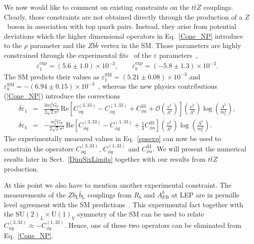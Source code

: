 \documentclass[preprint]{JHEP3}
\def\ttbZ{t\bar{t}Z}
\newcommand{\be}{\begin{eqnarray}}
\newcommand{\ee}{\end{eqnarray}}
\begin{document}
We now would like to comment on existing constraints on the $\ttbZ$ couplings.
Clearly, those constraints are not obtained directly through the production of a $Z$~boson in association with top quark pairs.
Instead, they arise from potential deviations which the higher dimensional operators in Eq.~\ref{Cone_NP} introduce to the $\rho$ parameter and the $Z b \bar{b}$ vertex in the SM.
Those parameters are highly constrained through the experimental fits~\cite{Ciuchini:2013pca} of the $\varepsilon$ parameters~\cite{Altarelli:1993sz},
\be
   \label{epsexp}
   \varepsilon_1^\mathrm{exp} = (5.6 \pm 1.0) \times 10^{-3}, \quad \quad \varepsilon_b^\mathrm{exp} = (-5.8 \pm 1.3) \times 10^{-3}.
\ee
The SM predicts their values as $\varepsilon_1^\mathrm{SM} = (5.21 \pm 0.08) \times 10^{-3} $ and $\varepsilon_b^\mathrm{SM} = -(6.94 \pm 0.15) \times 10^{-3}$~\cite{Ciuchini:2013pca},
whereas the new physics contributions (\ref{Cone_NP}) introduce the corrections~\cite{Larios:1999au}
\be
   \delta \varepsilon_1 &=& \frac{3 m_t^2 G_\mathrm{F}}{2\sqrt{2}\pi^2}  
   \, \mathrm{Re}\left[  C^{(3,33)}_{\phi q}-C^{(1,33)}_{\phi q} + C^{33}_{\phi u} + \mathcal{O}\left(\frac{v^2}{\Lambda^2} \right) \right]
   \left( \frac{v^2}{\Lambda^2} \right) \log\left(\frac{\Lambda^2}{m_t^2}\right),
   \\
   \delta \varepsilon_b &=& -\frac{m_t^2 G_\mathrm{F}}{2\sqrt{2}\pi^2} 
   \, \mathrm{Re}\left[  C^{(3,33)}_{\phi q}-C^{(1,33)}_{\phi q} + \frac14 C^{33}_{\phi u}  \right]
   \left( \frac{v^2}{\Lambda^2} \right)\log\left(\frac{\Lambda^2}{m_t^2}\right).
\ee
The experimentally measured values in Eq.~\ref{epsexp} can now be used to constrain the operators 
$C^{(3,33)}_{\phi q}$,  $C^{(1,33)}_{\phi q}$ and $C^{33}_{\phi u}$.
We will present the numerical results later in Sect.~\ref{DimSixLimits} together with our results from $\ttbZ$ production.

At this point we also have to mention another experimental constraint.
The measurements of the $Z b_\mathrm{L} \bar{b}_\mathrm{L}$ couplings from $R_b$ and $A^{b}_\mathrm{FB}$ at LEP are in permille level agreement 
with the SM predictions~\cite{Abdallah:2008ab}.
This experimental fact together with the $\mathrm{SU(2)}_L \times \mathrm{U(1)}_Y$ symmetry of the SM
can be used to relate $  C^{(3,33)}_{\phi q} \approx - C^{(1,33)}_{\phi q}$.
Hence, one of these two operators can be eliminated from Eq.~\ref{Cone_NP}.
\end{document}
